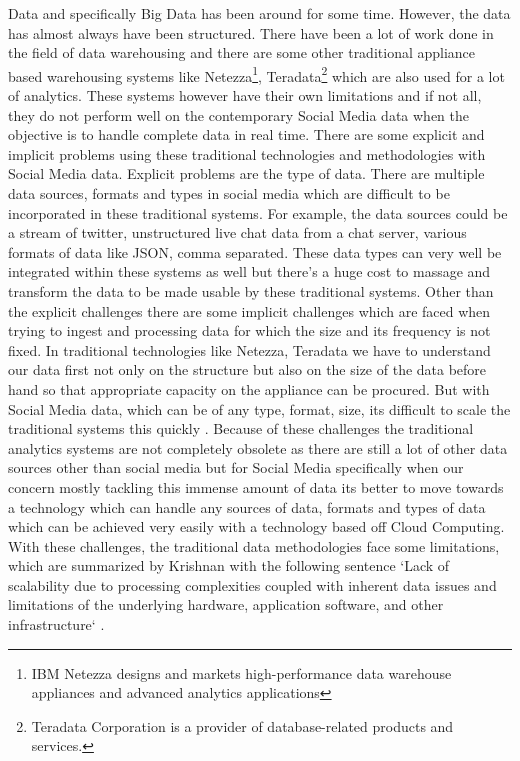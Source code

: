 \documentclass[sigconf]{acmart}
\begin{document}
Data and specifically Big Data has been around for some time. However, the data has almost always have been structured. There have been a lot of work done in the field of data warehousing and there are some other traditional appliance based warehousing systems like Netezza\footnote{IBM Netezza designs and markets high-performance data warehouse appliances and advanced analytics applications}, Teradata\footnote{Teradata Corporation is a provider of database-related products and services.} which are also used for a lot of analytics. These systems however have their own limitations and if not all, they do not perform well on the contemporary Social Media data \cite{sebabigdata} when the objective is to handle complete data in real time. There are some explicit and implicit problems using these traditional technologies and methodologies with Social Media data. Explicit problems are the type of data. There are multiple data sources, formats and types in social media which are difficult to be incorporated in these traditional systems. For example, the data sources could be a stream of twitter, unstructured live chat data from a chat server, various formats of data like JSON, comma separated. These data types can very well be integrated within these systems as well but there's a huge cost to massage and transform the data to be made usable by these traditional systems. Other than the explicit challenges there are some implicit challenges which are faced when trying to ingest and processing data for which the size and its frequency is not fixed. In traditional technologies like Netezza, Teradata we have to understand our data first not only on the structure but also on the size of the data before hand so that appropriate capacity on the appliance can be procured. But with Social Media data, which can be of any type, format, size, its difficult to scale the traditional systems this quickly \cite{georgevirthadoop}. Because of these challenges the traditional analytics systems are not completely obsolete as there are still a lot of other data sources other than social media but for Social Media specifically when our concern mostly tackling this immense amount of data its better to move towards a technology which can handle any sources of data, formats and types of data which can be achieved very easily with a technology based off Cloud Computing. With these challenges, the traditional data methodologies face some limitations, which are summarized by Krishnan with the following sentence `Lack of scalability due to processing complexities coupled with inherent data issues and limitations of the underlying hardware, application software, and other infrastructure` \cite{krishnan}.
\end{document}
